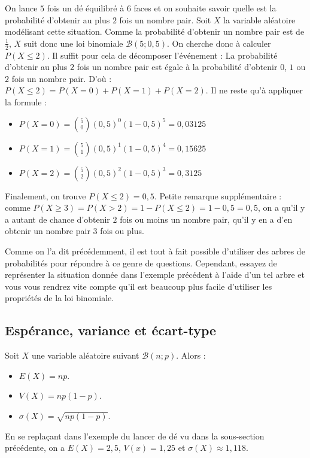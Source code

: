 	\begin{tip}[Exemple]
		On lance $5$ fois un dé équilibré à $6$ faces et on souhaite savoir quelle est la probabilité d'obtenir au plus $2$ fois un nombre pair.
		\newpar
		Soit $X$ la variable aléatoire modélisant cette situation. Comme la probabilité d'obtenir un nombre pair est de $\frac{1}{2}$, $X$ suit donc une loi binomiale $\mathcal{B}(5; 0,5)$.
		\newpar
		On cherche donc à calculer $P(X \leq 2)$. Il suffit pour cela de décomposer l'événement :
		\newpar
		La probabilité d'obtenir au plus $2$ fois un nombre pair est égale à la probabilité d'obtenir $0$, $1$ ou $2$ fois un nombre pair. D'où :
		\newpar
		$P(X \leq 2) = P(X = 0) + P(X = 1) + P(X = 2)$.
		\newpar
		Il ne reste qu'à appliquer la formule :
		\begin{itemize}
			\item $P(X = 0) = \binom{5}{0}(0,5)^0(1-0,5)^5 = 0,03125$
			\item $P(X = 1) = \binom{5}{1}(0,5)^1(1-0,5)^4 = 0,15625$
			\item $P(X = 2) = \binom{5}{2}(0,5)^2(1-0,5)^3 = 0,3125$
		\end{itemize}
		Finalement, on trouve $P(X \leq 2) = 0,5$.
		\newpar
		Petite remarque supplémentaire : comme $P(X \geq 3) = P(X > 2) = 1 - P(X \leq 2) = 1 - 0,5 = 0,5$, on a qu'il y a autant de chance d'obtenir $2$ fois ou moins un nombre pair, qu'il y en a d'en obtenir un nombre pair $3$ fois ou plus.
	\end{tip}
	
	Comme on l'a dit précédemment, il est tout à fait possible d'utiliser des arbres de probabilités pour répondre à ce genre de questions. Cependant, essayez de représenter la situation donnée dans l'exemple précédent à l'aide d'un tel arbre et vous vous rendrez vite compte qu'il est beaucoup plus facile d'utiliser les propriétés de la loi binomiale.
	
	\subsection{Espérance, variance et écart-type}
	
	\begin{formula}
		Soit $X$ une variable aléatoire suivant $\mathcal{B}(n; p)$. Alors :
		\begin{itemize}
			\item $E(X) = np$.
			\item $V(X) = np(1-p)$.
			\item $\sigma(X) = \sqrt{np(1-p)}$.
		\end{itemize}
	\end{formula}
	
	\begin{tip}[Exemple]
		En se replaçant dans l'exemple du lancer de dé vu dans la sous-section précédente, on a $E(X) = 2,5$, $V(x) = 1,25$ et $\sigma(X) \approx 1,118$.
	\end{tip}
